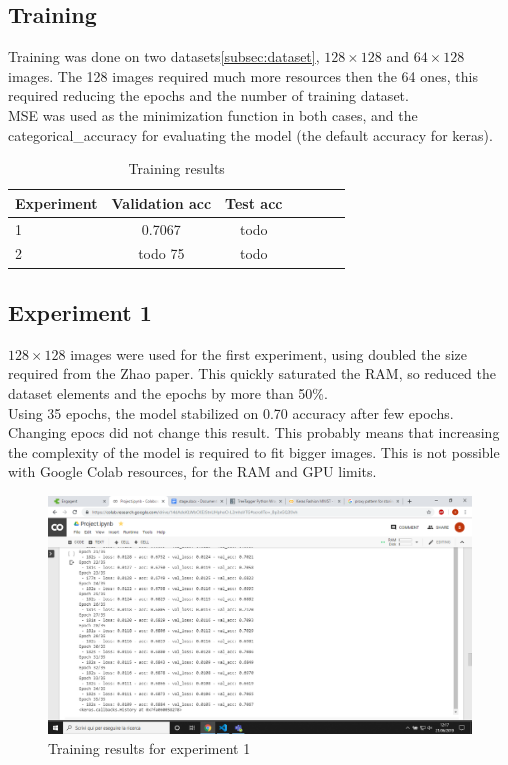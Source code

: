 \documentclass[twocolumn,showpacs,%
  nofootinbib,aps,superscriptaddress,%
  eqsecnum,prd,notitlepage,showkeys,10pt]{revtex4-1}
\begin{document}
\subsection{Training}
Training was done on two datasets\ref{subsec:dataset}, $128\times128$ and $64\times128$ images. The 128 images required much more resources then the 64 ones, this required reducing the epochs and the number of training dataset.\\
MSE was used as the minimization function in both cases, and the categorical\_accuracy for evaluating the model (the default accuracy for keras).
\begin{table}[H] \label{tab:training}
    \centering
    \begin{tabular}{l|c|c|c|c|c|c}
    Experiment       &  Validation acc & Test acc \\\hline
    1          &  0.7067           & todo            \\\hline
    2          &  todo 75        & todo    
    \end{tabular}
    \caption{\label{tab:widgets}Training results}
    \end{table}

\subsection{Experiment 1}
$128\times128$ images were used for the first experiment, using doubled the size required from the Zhao paper. This quickly saturated the RAM, so reduced the dataset elements and the epochs by more than 50\%.\\
Using 35 epochs, the model stabilized on 0.70 accuracy after few epochs. Changing epocs did not change this result. This probably means that increasing the complexity of the model is required to fit bigger images. This is not possible with Google Colab resources, for the RAM and GPU limits.\\
\begin{figure}[H]
\includegraphics[width=\textwidth]{images/128x128_35epoch_10batch_fit.png}
\caption{\label{fig:your-figure}Training results for experiment 1}
\end{figure}
\end{document}
